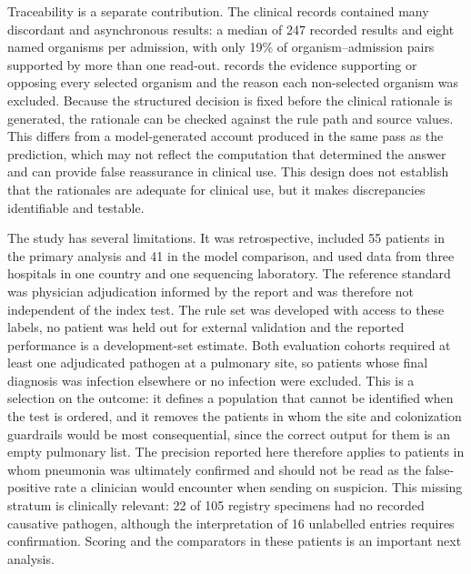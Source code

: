 Traceability is a separate contribution. The clinical records contained many discordant and asynchronous results: a median of 247 recorded results and eight named organisms per admission, with only 19\% of organism--admission pairs supported by more than one read-out. \toolname records the evidence supporting or opposing every selected organism and the reason each non-selected organism was excluded. Because the structured decision is fixed before the clinical rationale is generated, the rationale can be checked against the rule path and source values. This differs from a model-generated account produced in the same pass as the prediction, which may not reflect the computation that determined the answer\cite{turpin2023language} and can provide false reassurance in clinical use\cite{ghassemi2021false}. This design does not establish that the rationales are adequate for clinical use, but it makes discrepancies identifiable and testable.

The study has several limitations. It was retrospective, included 55 patients in the primary analysis and 41 in the model comparison, and used data from three hospitals in one country and one sequencing laboratory. The reference standard was physician adjudication informed by the \mngs report and was therefore not independent of the index test. The rule set was developed with access to these labels, no patient was held out for external validation and the reported performance is a development-set estimate. Both evaluation cohorts required at least one adjudicated pathogen at a pulmonary site, so patients whose final diagnosis was infection elsewhere or no infection were excluded. This is a selection on the outcome: it defines a population that cannot be identified when the test is ordered, and it removes the patients in whom the site and colonization guardrails would be most consequential, since the correct output for them is an empty pulmonary list. The precision reported here therefore applies to patients in whom pneumonia was ultimately confirmed and should not be read as the false-positive rate a clinician would encounter when sending \mngs on suspicion. This missing stratum is clinically relevant: 22 of 105 registry specimens had no recorded causative pathogen, although the interpretation of 16 unlabelled entries requires confirmation. Scoring \toolname and the comparators in these patients is an important next analysis.

